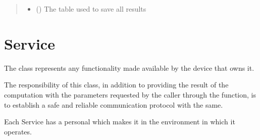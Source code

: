\documentclass[a4paper,10pt,english,openany,oneside]{sphinxmanual}
\begin{document}
\begin{fulllineitems}
\begin{fulllineitems}
\begin{quote}
\begin{description}
\begin{itemize}
\item {} 
 () \textendash{} The table used to save all results

\end{itemize}

\end{description}\end{quote}

\end{fulllineitems}


\end{fulllineitems}



\section{Service}
\label{\detokenize{code:service}}
The  class represents any functionality made available by the device that owns it.

The responsibility of this class, in addition to providing the result of the computation with the parameters
requested by the caller through the  function, is to establish a safe and reliable communication protocol with the same.

Each Service has a personal  which makes it  in the environment in which it operates.
\end{document}
